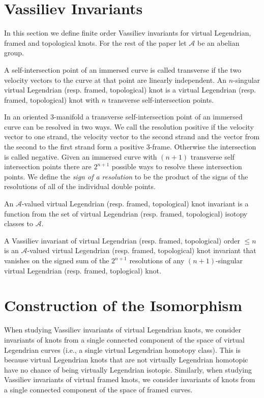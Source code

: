 


\section{Vassiliev Invariants}
In this section we define finite order Vassiliev invariants for virtual Legendrian, framed and topological knots. For the rest of the paper let $\mathcal{A}$ be an abelian group.

A self-intersection point of an immersed curve is called transverse if the two velocity vectors to the curve at that point are linearly independent.  An $n$-singular virtual Legendrian (resp. framed, topological) knot is a virtual Legendrian (resp. framed, topological) knot with $n$ transverse self-intersection points.

In an oriented $3$-manifold a transverse self-intersection point of an immersed curve can be resolved in two ways.  We call the resolution positive if the velocity vector to one strand, the velocity vector to the second strand and the vector from the second to the first strand form a positive $3$-frame.  Otherwise the intersection is called negative.  Given an immersed curve with $(n+1)$ transverse self intersection points there are $2^{n+1}$ possible ways to resolve these intersection points. We define the {\it sign of a resolution} to be the product of the signs of the resolutions of all of the individual double points. 

An $\mathcal{A}$-valued virtual Legendrian (resp. framed, topological) knot invariant is a function from the set of virtual Legendrian (resp. framed, topological) isotopy classes to $\mathcal{A}$.

A Vassiliev invariant of virtual Legendrian (resp. framed, topological) order $\leq n$ is an $\mathcal{A}$-valued virtual Legendrian (resp. framed, topological) knot invariant that vanishes on the signed sum of the $2^{n+1}$ resolutions of any $(n+1)$-singular virtual Legendrian (resp. framed, toplogical) knot.
 
\section{Construction of the Isomorphism}
When studying Vassiliev invariants of virtual Legendrian knots, we consider invariants of knots from a single connected component of the space of virtual Legendrian curves (i.e., a single virtual Legendrian homotopy class).  This is because virtual Legendrian knots that are not virtually Legendrian homotopic have no chance of being virtually Legendrian isotopic.  Similarly, when studying Vassiliev invariants of virtual framed knots, we consider invariants of knots from a single connected component of the space of framed curves.

